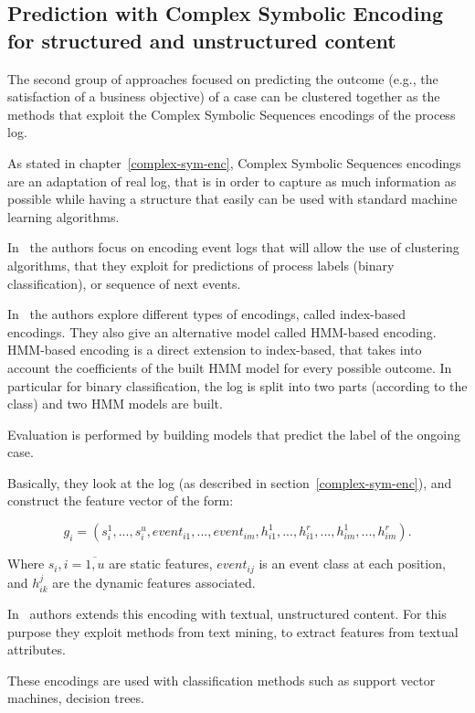 \subsection{Prediction with Complex Symbolic Encoding for structured and unstructured content}

The second group of approaches focused on predicting the outcome (e.g., the satisfaction of a business objective) of a case can be clustered together as the methods that exploit the Complex Symbolic Sequences encodings of the process log.

As stated in chapter~\ref{complex-sym-enc}, Complex Symbolic Sequences encodings are an adaptation of real log, that is in order to capture as much information as possible while having a structure that easily can be used with standard machine learning algorithms.

In~\cite{Leontjeva2015} the authors focus on encoding event logs that will allow the use of clustering algorithms, that they exploit for predictions of process labels (binary classification), or sequence of next events.

In~\cite{Leontjeva2015} the authors explore different types of encodings, called index-based encodings. They also give an alternative model called HMM-based encoding. HMM-based encoding is a direct extension to index-based, that takes into account the coefficients of the built HMM model for every possible outcome. In particular for binary classification, the log is split into two parts (according to the class) and two HMM models are built.

Evaluation is performed by building models that predict the label of the ongoing case.

Basically, they look at the log (as described in section~\ref{complex-sym-enc}), and construct the feature vector of the form:

\[g_i = (s_i^1,...,s_i^u,event_{i1},...,event_{im},h_{i1}^1,...,h_{i1}^r,...,h_{im}^1,...,h_{im}^r).\]

Where $s_i, i=\overline{1,u}$ are static features, $event_{ij}$ is an event class at each position, and $h_{ik}^{j}$ are the dynamic features associated. 

In~\cite{DBLP:conf/bpm/TeinemaaDMF16} authors extends this encoding with textual, unstructured content. For this purpose they exploit methods from text mining, to extract features from textual attributes.


These encodings are used with classification methods such as support vector machines, decision trees. 

